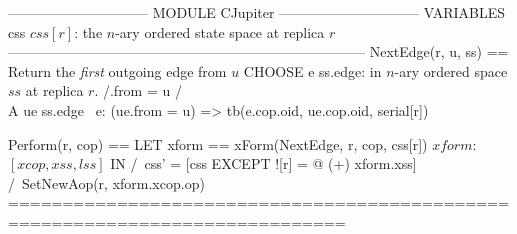 \documentclass{article}
\begin{document}
\begin{tla}
------------------------------ MODULE CJupiter ------------------------------
VARIABLES css  \* $css[r]$: the $n$-ary ordered state space at replica $r$
-----------------------------------------------------------------------------
NextEdge(r, u, ss) ==     \* Return the \emph{first} outgoing edge from $u$ 
    CHOOSE e \in ss.edge: \* in $n$-ary ordered space $ss$ at replica $r$.
        /\e.from = u 
        /\\A ue \in ss.edge \ {e}: 
           (ue.from = u) => tb(e.cop.oid, ue.cop.oid, serial[r])
    
Perform(r, cop) == 
    LET xform == xForm(NextEdge, r, cop, css[r])  \* $xform$: $[xcop, xss, lss]$
    IN  /\ css' = [css EXCEPT ![r] = @ (+) xform.xss]
        /\ SetNewAop(r, xform.xcop.op)
=============================================================================
\end{tla}
\end{document}
